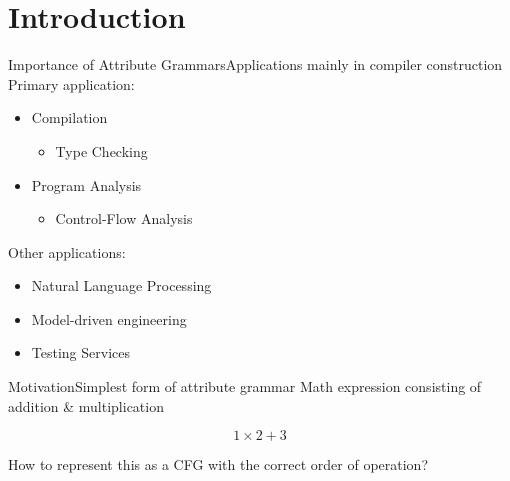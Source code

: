 \section{Introduction}

\begin{frame}{Importance of Attribute Grammars}{Applications mainly in compiler construction}
Primary application:

\begin{itemize}
    \item Compilation
    \begin{itemize}
        \item  Type Checking
    \end{itemize}
    \item Program Analysis
        \begin{itemize}
            \item \alert{Control-Flow Analysis}
        \end{itemize}
\end{itemize}

\emptyline

Other applications:
\begin{itemize}
    \item Natural Language Processing \cite{10.1007/978-3-642-25324-9_25}
    \item Model-driven engineering \cite{schone2020connecting}
    \item Testing Services \cite{habibisharif}
\end{itemize}
\end{frame}



\begin{frame}{Motivation}{Simplest form of attribute grammar}
Math expression consisting of addition \& multiplication

\[ 1 \times 2 + 3  \]

\newlinevspace

How to represent this as a \alert{CFG} with the correct order of operation?
\end{frame}

